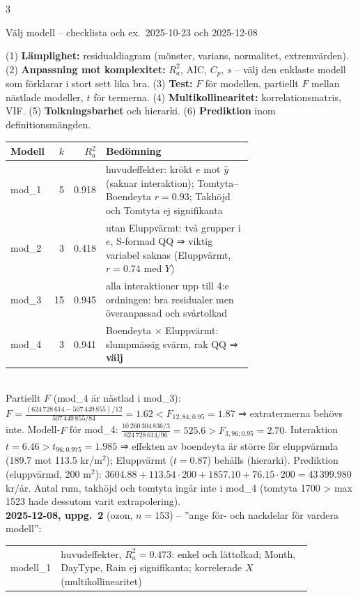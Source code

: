 \documentclass[8pt]{extarticle}
\makeatletter
\newcounter{sect}
\newcommand{\sect}[3][hd]{\par\vspace{1.5pt}\refstepcounter{sect}\noindent
  {\setlength{\fboxsep}{1.8pt}\colorbox{#1}{\parbox{\dimexpr\linewidth-2\fboxsep}{\color{white}\sffamily\bfseries
  \strut\thesect\enspace #2}}}\label{#3}\par\nobreak\vspace{0.8pt}\@afterheading}
\makeatother
\begin{document}
\begin{multicols*}{3}
\sect[cBygg]{Välj modell – checklista och ex.\ 2025-10-23 och 2025-12-08}{sec:valj}
(1) \textbf{Lämplighet:} residualdiagram (mönster, varians, normalitet, extremvärden). (2) \textbf{Anpassning mot komplexitet:} $R^2_a$, AIC, $C_p$, $s$ – välj den enklaste modell som förklarar i stort sett lika bra. (3) \textbf{Test:} $F$ för modellen, partiellt $F$ mellan nästlade modeller, $t$ för termerna. (4) \textbf{Multikollinearitet:} korrelationsmatris, VIF. (5) \textbf{Tolkningsbarhet} och hierarki. (6) \textbf{Prediktion} inom definitionsmängden.\\[1pt]
{\small
\begin{tabular}{@{}lrr>{\raggedright\arraybackslash}p{0.69\linewidth}@{}}
Modell & $k$ & $R^2_a$ & Bedömning\\\hline
mod\_1 & 5 & 0.918 & 5 huvudeffekter: krökt $e$ mot $\hat y$ (saknar interaktion); Tomtyta–Boendeyta $r=0.93$; Takhöjd och Tomtyta ej signifikanta\\
mod\_2 & 3 & 0.418 & utan Eluppvärmt: två grupper i $e$, S-formad QQ ⇒ viktig variabel saknas (Eluppvärmt, $r=0.74$ med $Y$)\\
mod\_3 & 15 & 0.945 & alla interaktioner upp till 4:e ordningen: bra residualer men överanpassad och svårtolkad\\
mod\_4 & 3 & 0.941 & Boendeyta × Eluppvärmt: slumpmässig svärm, rak QQ ⇒ \textbf{välj}
\end{tabular}}\\[1pt]
Partiellt $F$ (mod\_4 är nästlad i mod\_3): $F=\frac{(624\,728\,614-507\,449\,855)/12}{507\,449\,855/84}=1.62<F_{12,84;0.95}=1.87$ ⇒ extratermerna behövs inte. Modell-$F$ för mod\_4: $\frac{10\,260\,304\,836/3}{624\,728\,614/96}=525.6>F_{3,96;0.95}=2.70$. Interaktion $t=6.46>t_{96;0.975}=1.985$ ⇒ effekten av boendeyta är större för eluppvärmda (189.7 mot 113.5 kr/m$^2$); Eluppvärmt ($t=0.87$) behålls (hierarki). Prediktion (eluppvärmd, 200 m$^2$): $3604.88+113.54\cdot200+1857.10+76.15\cdot200=43\,399.980$ kr/år. Antal rum, takhöjd och tomtyta ingår inte i mod\_4 (tomtyta 1700 > max 1523 hade dessutom varit extrapolering).\\[1pt]
\textbf{2025-12-08, uppg.\ 2} (ozon, $n=153$) – ”ange för- och nackdelar för vardera modell”:\\
{\small
\begin{tabular}{@{}l>{\raggedright\arraybackslash}p{0.86\linewidth}@{}}
modell\_1 & 6 huvudeffekter, $R^2_a=0.473$: enkel och lättolkad; Month, DayType, Rain ej signifikanta; korrelerade $X$ (multikollinearitet)\\

\end{tabular}}
\end{multicols*}
\end{document}
